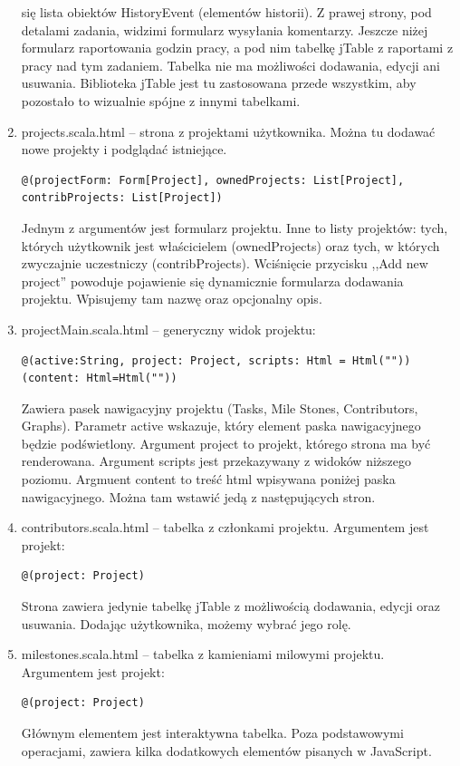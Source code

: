 \documentclass[a4paper,12pt,notitlepage]{mwrep}
\begin{document}
\begin{enumerate}
		się lista obiektów HistoryEvent (elementów historii). Z prawej strony, pod detalami zadania, widzimi formularz wysyłania komentarzy.
		Jeszcze niżej formularz raportowania godzin pracy, a pod nim tabelkę jTable z raportami z pracy nad tym zadaniem. Tabelka nie ma 
		możliwości dodawania, edycji ani usuwania. Biblioteka jTable jest tu zastosowana przede wszystkim, aby pozostało to wizualnie 
		spójne z innymi tabelkami.
	\item	projects.scala.html -- strona z projektami użytkownika. Można tu dodawać nowe projekty i podglądać istniejące.
		\begin{verbatim}@(projectForm: Form[Project], ownedProjects: List[Project], contribProjects: List[Project])\end{verbatim}
		Jednym z argumentów jest formularz projektu. Inne to listy projektów: tych, których użytkownik jest właścicielem (ownedProjects) 
		oraz tych, w których zwyczajnie uczestniczy (contribProjects). Wciśnięcie przycisku ,,Add new project'' powoduje pojawienie się 
		dynamicznie formularza dodawania projektu. Wpisujemy tam nazwę oraz opcjonalny opis.
	\item	projectMain.scala.html -- generyczny widok projektu:
		\begin{verbatim}@(active:String, project: Project, scripts: Html = Html(""))(content: Html=Html(""))\end{verbatim}
		Zawiera pasek nawigacyjny projektu (Tasks, Mile Stones, Contributors, Graphs). Parametr active wskazuje, który element paska 
		nawigacyjnego będzie podświetlony. Argument project to projekt, którego strona ma być renderowana. Argument scripts jest przekazywany 
		z widoków niższego poziomu. Argmuent content to treść html wpisywana poniżej paska nawigacyjnego. Można tam wstawić jedą z następujących  			stron.
	\item	contributors.scala.html -- tabelka z członkami projektu. Argumentem jest projekt:
		\begin{verbatim}@(project: Project)\end{verbatim}
		Strona zawiera jedynie tabelkę jTable z możliwością dodawania, edycji oraz usuwania. Dodając użytkownika, możemy wybrać jego rolę.
	\item	milestones.scala.html -- tabelka z kamieniami milowymi projektu. Argumentem jest projekt:
		\begin{verbatim}@(project: Project)\end{verbatim}
		Głównym elementem jest interaktywna tabelka. Poza podstawowymi operacjami, zawiera kilka dodatkowych elementów pisanych w JavaScript. 

\end{enumerate}
\end{document}
